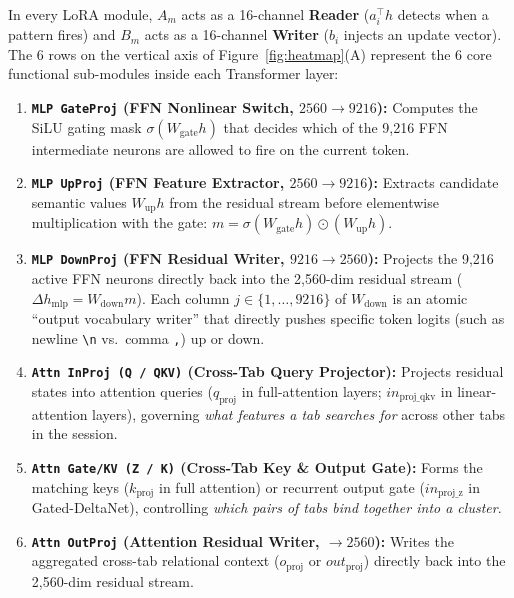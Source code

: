 \documentclass[11pt,a4paper]{article}
\begin{document}
In every LoRA module, $A_m$ acts as a 16-channel \textbf{Reader} ($a_i^\top h$ detects when a pattern fires) and $B_m$ acts as a 16-channel \textbf{Writer} ($b_i$ injects an update vector). The 6 rows on the vertical axis of Figure~\ref{fig:heatmap}(A) represent the 6 core functional sub-modules inside each Transformer layer:
\begin{enumerate}
    \item \textbf{\texttt{MLP GateProj} (FFN Nonlinear Switch, $2560 \to 9216$):} Computes the SiLU gating mask $\sigma(W_{\text{gate}} h)$ that decides which of the 9,216 FFN intermediate neurons are allowed to fire on the current token.
    \item \textbf{\texttt{MLP UpProj} (FFN Feature Extractor, $2560 \to 9216$):} Extracts candidate semantic values $W_{\text{up}} h$ from the residual stream before elementwise multiplication with the gate: $m = \sigma(W_{\text{gate}} h) \odot (W_{\text{up}} h)$.
    \item \textbf{\texttt{MLP DownProj} (FFN Residual Writer, $9216 \to 2560$):} Projects the 9,216 active FFN neurons directly back into the 2,560-dim residual stream ($\Delta h_{\text{mlp}} = W_{\text{down}} m$). Each column $j \in \{1,\dots,9216\}$ of $W_{\text{down}}$ is an atomic ``output vocabulary writer'' that directly pushes specific token logits (such as newline \texttt{\textbackslash n} vs.\ comma \texttt{,}) up or down.
    \item \textbf{\texttt{Attn InProj (Q / QKV)} (Cross-Tab Query Projector):} Projects residual states into attention queries ($q_{\text{proj}}$ in full-attention layers; $in_{\text{proj\_qkv}}$ in linear-attention layers), governing \emph{what features a tab searches for} across other tabs in the session.
    \item \textbf{\texttt{Attn Gate/KV (Z / K)} (Cross-Tab Key \& Output Gate):} Forms the matching keys ($k_{\text{proj}}$ in full attention) or recurrent output gate ($in_{\text{proj\_z}}$ in Gated-DeltaNet), controlling \emph{which pairs of tabs bind together into a cluster}.
    \item \textbf{\texttt{Attn OutProj} (Attention Residual Writer, $\to 2560$):} Writes the aggregated cross-tab relational context ($o_{\text{proj}}$ or $out_{\text{proj}}$) directly back into the 2,560-dim residual stream.
\end{enumerate}
\end{document}
